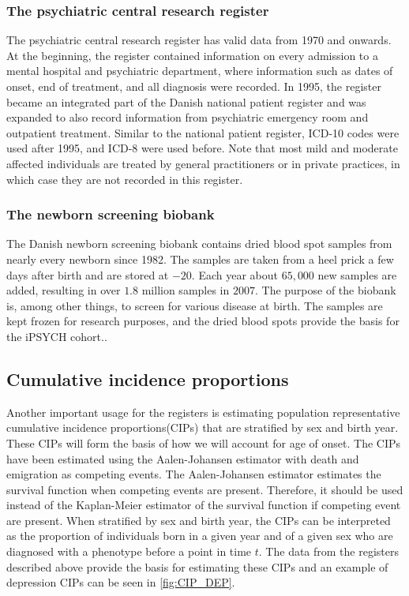 \subsubsection{The psychiatric central research register}
The psychiatric central research register has valid data from 1970 and onwards. At the beginning, the register contained information on every admission to a mental hospital and psychiatric department, where information such as dates of onset, end of treatment, and all diagnosis were recorded. In 1995, the register became an integrated part of the Danish national patient register and was expanded to also record information from psychiatric emergency room and outpatient treatment. Similar to the national patient register, ICD-10 codes were used after 1995, and ICD-8 were used before. Note that most mild and moderate affected individuals are treated by general practitioners or in private practices, in which case they are not recorded in this register.\cite{mors2011danish}


\subsubsection{The newborn screening biobank}
The Danish newborn screening biobank contains dried blood spot samples from 
nearly every newborn since 1982. The samples are taken from a heel prick a few 
days after birth and are stored at $ -20 $\textcelsius. Each year about $ 
65,000 $ new samples are added, resulting in over $ 1.8 $ million samples in $ 
2007 $. The purpose of the biobank is, among other things, to screen for 
various disease at birth. The samples are kept frozen for research purposes, 
and the dried blood spots provide the basis for the iPSYCH cohort.\cite{norgaard2007storage}.

\subsection{Cumulative incidence proportions}
Another important usage for the registers is estimating population 
representative cumulative incidence proportions(CIPs) that are stratified by 
sex and birth year. These CIPs will form the basis of how we will account for 
age of onset. The CIPs have been estimated using the Aalen-Johansen 
estimator\cite{hansen2017estimating} with death and emigration as competing 
events. The Aalen-Johansen estimator estimates the survival function when 
competing events are present. Therefore, it should be used instead of the 
Kaplan-Meier estimator of the survival function if competing event are present. 
When stratified by sex and birth year, the CIPs can be interpreted as the 
proportion of individuals born in a given year and of a given sex who are 
diagnosed with a phenotype before a point in time $ t $. The data from the 
registers described above provide the basis for estimating these CIPs and an 
example of depression CIPs can be seen in \cref{fig:CIP_DEP}.

